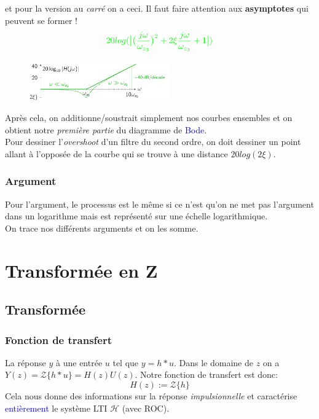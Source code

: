 \documentclass{report}
\begin{document}
et pour la version au \textit{carré} on a ceci. Il faut faire attention aux \textbf{asymptotes} qui peuvent se former !
\begin{align*}
\textcolor{green}{20log(\bigr|  \bigr(\frac{j\omega}{\omega_{z_3}}\bigr)^2 + 2 \xi \frac{j\omega}{\omega_{z_3}} +1 \bigr|)}
\end{align*}
\begin{figure}[H]
\centering
\includegraphics[width=6cm]{img/jomegamax.png}
\end{figure}
Après cela, on additionne/soustrait simplement nos courbes ensembles et on obtient notre \textit{première partie} du diagramme de \textcolor{blue}{Bode}.\\
Pour dessiner l'\textit{overshoot} d'un filtre du second ordre, on doit dessiner un point allant à l'opposée de la courbe qui se trouve à une distance $20 log(2 \xi)$.

\subsection{Argument}
Pour l'argument, le processus est le même si ce n'est qu'on ne met pas l'argument dans un logarithme mais est représenté sur une échelle logarithmique.\\
On trace nos différents arguments et on les somme.

\chapter{Transformée en Z}
\section{Transformée}
\subsection{Fonction de transfert}
La réponse $y$ à une entrée $u$ tel que $y = h \ast u $. Dans le domaine de $z$ on a $Y(z) = \mathcal{Z}\{h \ast u \} = H(z) U(z)$. Notre fonction de transfert est donc:
\begin{equation}
H(z) := \mathcal{Z}\{h\}
\end{equation}
Cela nous donne des informations sur la réponse \textit{impulsionnelle} et caractérise \textcolor{blue}{entièrement} le système LTI $\mathcal{H}$ (avec ROC).
\end{document}
